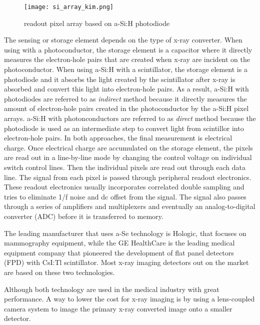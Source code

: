 \begin{figure}
\texttt{[image: si\_array\_kim.png]}
\label{fig:a-Si:H array}
\caption{readout pixel array based on a-Si:H photodiode}
\end{figure}

The sensing or storage element depends on the type of x-ray converter.  When using with a photoconductor, the storage element is a capacitor where it directly measures the electron-hole pairs that are created when x-ray are incident on the photoconductor.  When using a-Si:H with a scintillator, the storage element is a photodiode and it absorbs the light created by the scintillator after x-ray is absorbed and convert this light into electron-hole pairs.  As a result, a-Si:H with photodiodes are referred to as \textit{indirect} method because it directly measures the amount of electron-hole pairs created in the photoconductor by the a-Si:H pixel arrays.  a-Si:H with photonconductors are referred to as \textit{direct} method because the photodiode is used as an intermediate step to convert light from scintillor into electron-hole pairs.  In both approaches, the final measurement is electrical charge.  
Once electrical charge are accumulated on the storage element, the pixels are read out in a line-by-line mode by changing the control voltage on individual switch control lines.  Then the individual pixels are read out through each data line.  The signal from each pixel is passed through peripheral readout electronics.  These readout electronics usually incorporates correlated double sampling and tries to eliminate 1/f noise and dc offset from the signal.  The signal also passes through a series of amplifiers and multiplexers and eventually an analog-to-digital converter (ADC) before it is transferred to memory.  

The leading manufacturer that uses a-Se technology is Hologic, that focuses on mammography equipment, while the GE HealthCare is the leading medical equipment company that pioneered the development of flat panel detectors (FPD) with CsI:Tl scintillator.  Most x-ray imaging detectors out on the market are based on these two technologies.  

Although both technology are used in the medical industry with great performance.  A way to lower the cost for x-ray imaging is by using a lens-coupled camera system to image the primary x-ray converted image onto a smaller detector.

